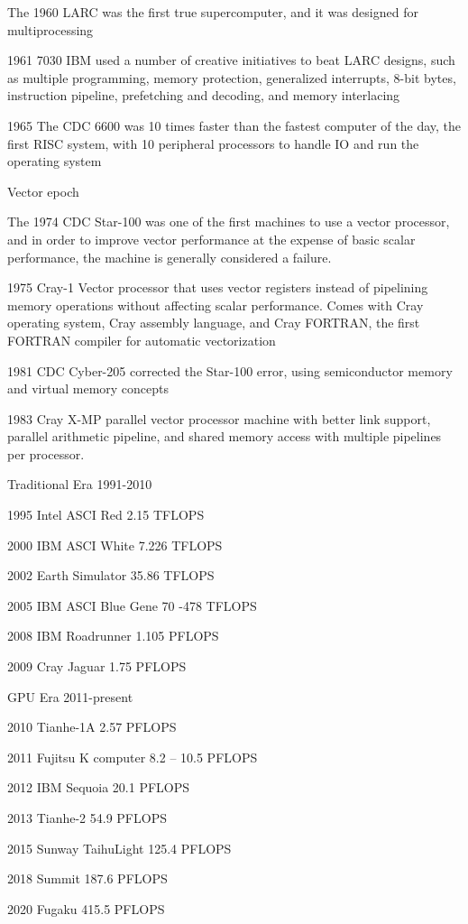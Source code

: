 \documentclass[a4paper,twoside]{scrbook}
\begin{document}
The 1960 LARC was the first true supercomputer, and it was designed for multiprocessing

1961 7030 IBM used a number of creative initiatives to beat LARC designs, such as multiple programming, memory protection, generalized interrupts, 8-bit bytes, instruction pipeline, prefetching and decoding, and memory interlacing

1965 The CDC 6600 was 10 times faster than the fastest computer of the day, the first RISC system, with 10 peripheral processors to handle IO and run the operating system

Vector epoch

The 1974 CDC Star-100 was one of the first machines to use a vector processor, and in order to improve vector performance at the expense of basic scalar performance, the machine is generally considered a failure.

1975 Cray-1 Vector processor that uses vector registers instead of pipelining memory operations without affecting scalar performance. Comes with Cray operating system, Cray assembly language, and Cray FORTRAN, the first FORTRAN compiler for automatic vectorization

1981 CDC Cyber-205 corrected the Star-100 error, using semiconductor memory and virtual memory concepts

1983 Cray X-MP parallel vector processor machine with better link support, parallel arithmetic pipeline, and shared memory access with multiple pipelines per processor.

Traditional Era 1991-2010

1995 Intel ASCI Red 2.15 TFLOPS

2000 IBM ASCI White 7.226 TFLOPS

2002 Earth Simulator 35.86 TFLOPS

2005 IBM ASCI Blue Gene 70 -478 TFLOPS

2008 IBM Roadrunner 1.105 PFLOPS

2009 Cray Jaguar 1.75 PFLOPS

GPU Era 2011-present

2010 Tianhe-1A 2.57 PFLOPS

2011 Fujitsu K computer 8.2 -- 10.5 PFLOPS

2012 IBM Sequoia 20.1 PFLOPS

2013 Tianhe-2 54.9 PFLOPS

2015 Sunway TaihuLight 125.4 PFLOPS

2018 Summit 187.6 PFLOPS

2020 Fugaku 415.5 PFLOPS
\end{document}

